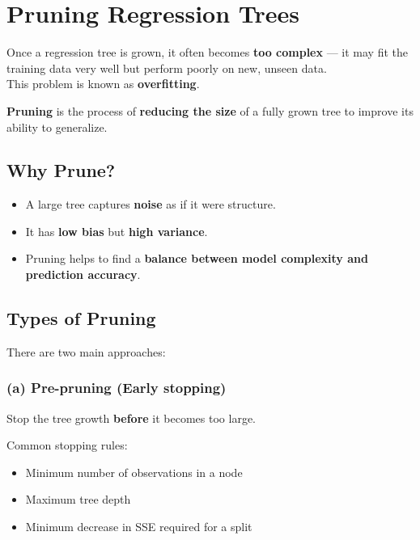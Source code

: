 \documentclass[
  letterpaper,
  DIV=11,
  numbers=noendperiod]{scrreprt}
\providecommand{\tightlist}{%
  \setlength{\itemsep}{0pt}\setlength{\parskip}{0pt}}\usepackage{longtable,booktabs,array}
\begin{document}
\section{Pruning Regression Trees}\label{pruning-regression-trees}

Once a regression tree is grown, it often becomes \textbf{too complex}
--- it may fit the training data very well but perform poorly on new,
unseen data.\\
This problem is known as \textbf{overfitting}.

\textbf{Pruning} is the process of \textbf{reducing the size} of a fully
grown tree to improve its ability to generalize.

\subsection{Why Prune?}\label{why-prune}

\begin{itemize}
\tightlist
\item
  A large tree captures \textbf{noise} as if it were structure.\\
\item
  It has \textbf{low bias} but \textbf{high variance}.\\
\item
  Pruning helps to find a \textbf{balance between model complexity and
  prediction accuracy}.
\end{itemize}

\subsection{Types of Pruning}\label{types-of-pruning}

There are two main approaches:

\subsubsection{(a) Pre-pruning (Early
stopping)}\label{a-pre-pruning-early-stopping}

Stop the tree growth \textbf{before} it becomes too large.

Common stopping rules:

\begin{itemize}
\item
  Minimum number of observations in a node
\item
  Maximum tree depth
\item
  Minimum decrease in SSE required for a split
\end{itemize}
\end{document}
